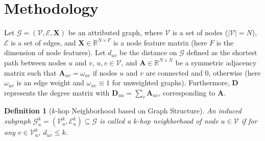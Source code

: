 \documentclass[letterpaper]{article} %
\newtheorem{definition}{Definition} %
\begin{document}
\section{Methodology}
Let $\mathcal{G} = (\mathcal{V}, \mathcal{E}, \boldsymbol{X})$ be an attributed graph, where $\mathcal{V}$ is a set of nodes ($|\mathcal{V}|=N$), $\mathcal{E}$ is a set of edges, and $\boldsymbol{X} \in \mathbb{R}^{N \times F}$ is a node feature matrix (here $F$ is the dimension of node features). Let $d_{uv}$ be the distance on $\mathcal{G}$ defined as the shortest path between nodes $u$ and $v$, $u,v\in \mathcal{V}$, and $\boldsymbol{A} \in \mathbb{R}^{N \times N}$ be a symmetric adjacency matrix such that
$\boldsymbol{A}_{uv} = \omega_{uv}$ if nodes $u$ and $v$ are connected and 0, otherwise 
(here $\omega_{uv}$ is an edge weight and $\omega_{uv}\equiv 1$ for unweighted graphs).
Furthermore, $\boldsymbol{D}$ represents the degree matrix with $\boldsymbol{D}_{uu} = \sum_v \boldsymbol{A}_{uv}$, corresponding to $\boldsymbol{A}$. 
\begin{definition}[\footnotesize{$k$-hop Neighborhood based on Graph Structure}]
\label{def1}
An induced subgraph $\mathcal{G}^k_u=(\mathcal{V}^k_u, \mathcal{E}^k_u)\subseteq \mathcal{G}$ is called a $k$-hop neighborhood of node $u\in \mathcal{V}$ if for any $v\in \mathcal{V}^k_u$, $d_{uv}\leq k$. %
\end{definition}
\end{document}
